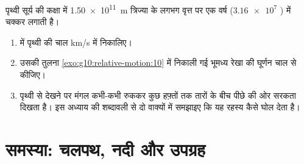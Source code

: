 \begin{exercise}[$\star\star\star$]\label{exo:g10:relative-motion:15}
पृथ्वी सूर्य की कक्षा में \qty{1.50e11}{m} त्रिज्या के लगभग वृत्त पर एक
वर्ष ($\num{3.16e7}$ ) में चक्कर लगाती है।
\begin{enumerate}
  \item {} में पृथ्वी की चाल \unit{km/s} में
        निकालिए।
  \item उसकी तुलना \cref{exo:g10:relative-motion:10} में निकाली गई भूमध्य रेखा की घूर्णन चाल से
        कीजिए।
  \item पृथ्वी से देखने पर मंगल कभी-कभी रुककर कुछ हफ़्तों तक तारों के
        बीच पीछे की ओर सरकता दिखता है। इस अध्याय की शब्दावली से दो
        वाक्यों में समझाइए कि  यह रहस्य कैसे
        घोल देता है।
\end{enumerate}
\end{exercise}

\section{समस्या: चलपथ, नदी और उपग्रह}


